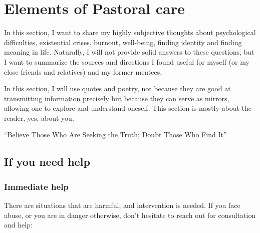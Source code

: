 \documentclass{article}
\begin{document}
\section{Elements of Pastoral care}

In this section, I want to share my highly subjective thoughts about psychological difficulties, existential crises, burnout, well-being, finding identity and finding meaning in life. 
Naturally, I will not provide solid answers to these questions, but I want to summarize the sources and directions I found useful for myself (or my close friends and relatives) and my former mentees.

In this section, I will use quotes and poetry, not because they are good at transmitting information precisely but because they can serve as mirrors, allowing one to explore and understand oneself. This section is mostly about the reader, yes, about you.

\vspace{1cm}
{``Believe Those Who Are Seeking the Truth; Doubt Those Who Find It''
\\[5pt]
}

\subsection{If you need help}

\subsubsection{Immediate help}

There are situations that are harmful, and intervention is needed. If you face abuse, or you are in danger otherwise, don't hesitate to reach out for consultation and help:
\end{document}
